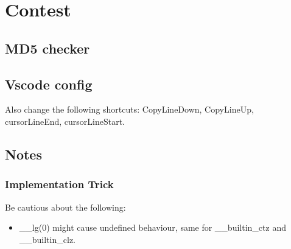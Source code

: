 \chapter{Contest}


\section{MD5 checker}

\section{Vscode config}
Also change the following shortcuts: CopyLineDown, CopyLineUp, cursorLineEnd, cursorLineStart.
    
    
\section{Notes}
\subsection{Implementation Trick}
Be cautious about the following:
\begin{itemize}
	\item \_\_lg(0) might cause undefined behaviour, same for \_\_builtin\_ctz and \_\_builtin\_clz.
\end{itemize}
